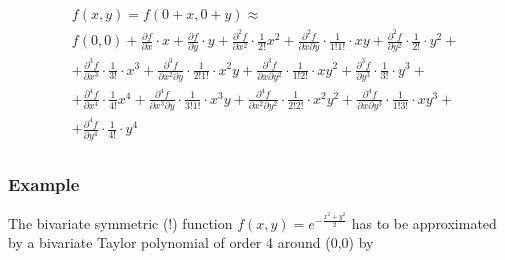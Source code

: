 \begin{equation}\label{eq:taylor_sries_aproximation_order_4}
\begin{aligned}
&f(x, y)=f(0+x, 0+y) \approx\\
&f(0,0)+\frac{\partial f}{\partial x} \cdot x+\frac{\partial f}{\partial y} \cdot y+\frac{\partial^2 f}{\partial x^2} \cdot \frac{1}{2 !} x^2+\frac{\partial^2 f}{\partial x \partial y} \cdot \frac{1}{1 ! 1 !} \cdot x y+\frac{\partial^2 f}{\partial y^2} \cdot \frac{1}{2 !} \cdot y^2+\\
& +\frac{\partial^3 f}{\partial x^3} \cdot \frac{1}{3 !} \cdot x^3+\frac{\partial^3 f}{\partial x^2 \partial y} \cdot \frac{1}{2 ! 1 !} \cdot x^2 y+\frac{\partial^3 f}{\partial x \partial y^2} \cdot \frac{1}{1 ! 2 !} \cdot x y^2+\frac{\partial^3 f}{\partial y^3} \cdot \frac{1}{3 !} \cdot y^3+ \\
& +\frac{\partial^4 f}{\partial x^4} \cdot \frac{1}{4 !} x^4+\frac{\partial^4 f}{\partial x^3 \partial y} \cdot \frac{1}{3 ! 1 !} \cdot x^3 y+\frac{\partial^4 f}{\partial x^2 \partial y^2} \cdot \frac{1}{2 ! 2 !} \cdot x^2 y^2+\frac{\partial^4 f}{\partial x \partial y^3} \cdot \frac{1}{1 ! 3 !} \cdot x y^3+ \\
& +\frac{\partial^4 f}{\partial y^4} \cdot \frac{1}{4 !} \cdot y^4 \\
&
\end{aligned}
\end{equation}
\subsubsection{Example}
The bivariate symmetric (!) function $f(x, y)=e^{-\frac{x^2+y^2}{2}}$ has to be approximated by a bivariate Taylor polynomial of order 4 around (0,0) by

